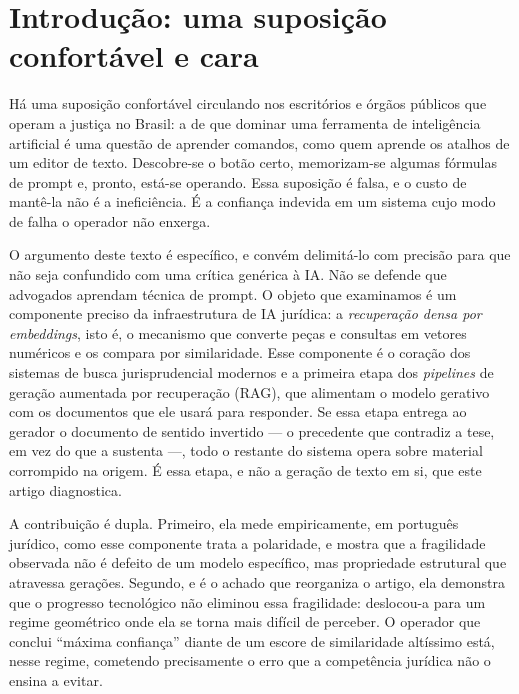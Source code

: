 \documentclass[11pt]{article}
\begin{document}
\begin{abstract}
\vspace{0.6em}
\noindent\textbf{Palavras-chave:} inteligência artificial jurídica; recuperação
densa; \textit{embeddings}; anisotropia; polaridade; geração aumentada por
recuperação; prova digital.
\end{abstract}

\section{Introdução: uma suposição confortável e cara}

Há uma suposição confortável circulando nos escritórios e órgãos públicos que
operam a justiça no Brasil: a de que dominar uma ferramenta de inteligência
artificial é uma questão de aprender comandos, como quem aprende os atalhos de
um editor de texto. Descobre-se o botão certo, memorizam-se algumas fórmulas de
prompt e, pronto, está-se operando. Essa suposição é falsa, e o custo de
mantê-la não é a ineficiência. É a confiança indevida em um sistema cujo modo de
falha o operador não enxerga.

O argumento deste texto é específico, e convém delimitá-lo com precisão para que
não seja confundido com uma crítica genérica à IA. Não se defende que advogados
aprendam técnica de prompt. O objeto que examinamos é um componente preciso da
infraestrutura de IA jurídica: a \emph{recuperação densa por
\textit{embeddings}}, isto é, o mecanismo que converte peças e consultas em
vetores numéricos e os compara por similaridade. Esse componente é o coração dos
sistemas de busca jurisprudencial modernos e a primeira etapa dos
\textit{pipelines} de geração aumentada por recuperação (RAG), que alimentam o
modelo gerativo com os documentos que ele usará para responder. Se essa etapa
entrega ao gerador o documento de sentido invertido --- o precedente que
contradiz a tese, em vez do que a sustenta ---, todo o restante do sistema opera
sobre material corrompido na origem. É essa etapa, e não a geração de texto em si,
que este artigo diagnostica.

A contribuição é dupla. Primeiro, ela mede empiricamente, em português jurídico,
como esse componente trata a polaridade, e mostra que a fragilidade observada não
é defeito de um modelo específico, mas propriedade estrutural que atravessa
gerações. Segundo, e é o achado que reorganiza o artigo, ela demonstra que o
progresso tecnológico não eliminou essa fragilidade: deslocou-a para um regime
geométrico onde ela se torna mais difícil de perceber. O operador que conclui
``máxima confiança'' diante de um escore de similaridade altíssimo está, nesse
regime, cometendo precisamente o erro que a competência jurídica não o ensina a
evitar.
\end{document}

